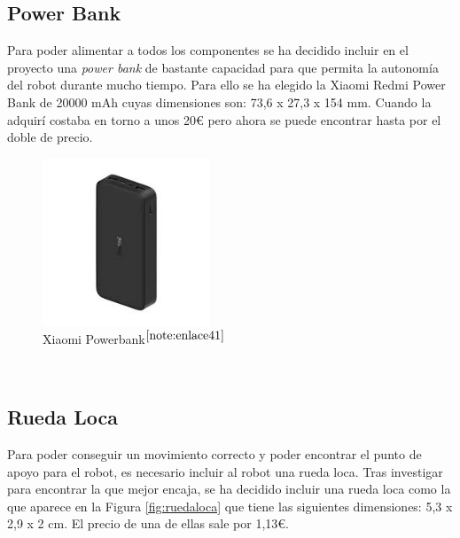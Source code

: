 \setcounter{footnote}{40} %

\subsection{Power Bank}

Para poder alimentar a todos los componentes se ha decidido incluir en el proyecto una \textit{power bank} de bastante capacidad para que permita la autonomía del robot durante mucho tiempo. Para ello se ha elegido la Xiaomi Redmi Power Bank de 20000 mAh cuyas dimensiones son: 73,6 x 27,3 x 154 mm. Cuando la adquirí costaba en torno a unos 20€ pero ahora se puede encontrar hasta por el doble de precio. 

\begin{figure} [h!]
	\begin{center}
		\includegraphics[width=5cm]{figs/powerbank.png}
	\end{center}
	\caption{Xiaomi Powerbank$^{\ref{note:enlace41}}$} 
	\label{fig:powerbank}
\end{figure}\

\setcounter{footnote}{41} %

\subsection{Rueda Loca}

Para poder conseguir un movimiento correcto y poder encontrar el punto de apoyo para el robot, es necesario incluir al robot una rueda loca. Tras investigar para encontrar la que mejor encaja, se ha decidido incluir una rueda loca como la que aparece en la Figura \ref{fig:ruedaloca} que tiene las siguientes dimensiones: 5,3 x 2,9 x 2 cm. El precio de una de ellas sale por 1,13€.

